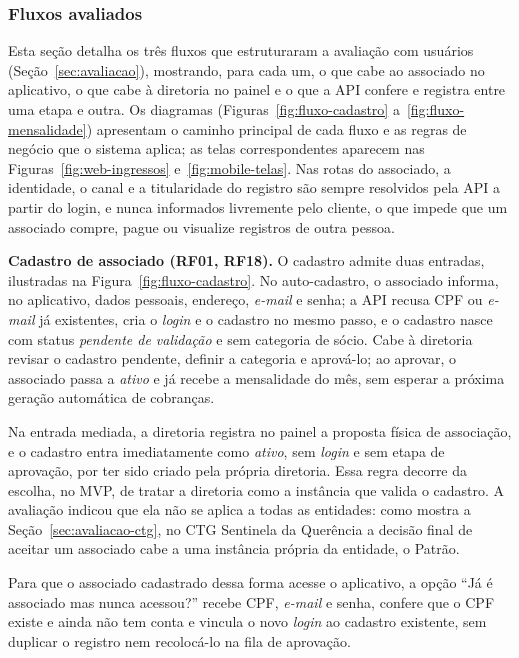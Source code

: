\documentclass[12pt,a4paper]{article}
\begin{document}
\subsubsection{Fluxos avaliados}
\label{sec:fluxos-avaliados}

Esta seção detalha os três fluxos que estruturaram a avaliação com usuários
(Seção~\ref{sec:avaliacao}), mostrando, para cada um, o que cabe ao associado no aplicativo, o que
cabe à diretoria no painel e o que a API confere e registra entre uma etapa e outra. Os diagramas
(Figuras~\ref{fig:fluxo-cadastro} a~\ref{fig:fluxo-mensalidade}) apresentam o caminho principal de
cada fluxo e as regras de negócio que o sistema aplica; as telas correspondentes aparecem nas
Figuras~\ref{fig:web-ingressos} e~\ref{fig:mobile-telas}. Nas rotas do associado, a identidade, o
canal e a titularidade do registro são sempre resolvidos pela API a partir do login, e nunca
informados livremente pelo cliente, o que impede que um associado compre, pague ou visualize
registros de outra pessoa.

\textbf{Cadastro de associado (RF01, RF18).} O cadastro admite duas entradas, ilustradas na
Figura~\ref{fig:fluxo-cadastro}. No auto-cadastro, o associado informa, no aplicativo, dados pessoais,
endereço, \textit{e-mail} e senha; a API recusa CPF ou \textit{e-mail} já existentes, cria o \textit{login}
e o cadastro no mesmo passo, e o cadastro nasce com status \textit{pendente de validação} e sem
categoria de sócio. Cabe à diretoria revisar o cadastro pendente, definir a categoria e aprová-lo; ao
aprovar, o associado passa a \textit{ativo} e já recebe a mensalidade do mês, sem esperar a próxima
geração automática de cobranças.

Na entrada mediada, a diretoria registra no painel a proposta física
de associação, e o cadastro entra imediatamente como \textit{ativo}, sem \textit{login} e sem etapa de
aprovação, por ter sido criado pela própria diretoria. Essa regra decorre da escolha, no MVP, de tratar a
diretoria como a instância que valida o cadastro. A avaliação indicou que ela não se aplica a todas
as entidades: como mostra a Seção~\ref{sec:avaliacao-ctg}, no CTG Sentinela da Querência a decisão
final de aceitar um associado cabe a uma instância própria da entidade, o Patrão.

Para que o associado
cadastrado dessa forma acesse o aplicativo, a opção ``Já é associado mas nunca acessou?'' recebe CPF,
\textit{e-mail} e senha, confere que o CPF existe e ainda não tem conta e vincula o novo \textit{login}
ao cadastro existente, sem duplicar o registro nem recolocá-lo na fila de aprovação.
\end{document}
